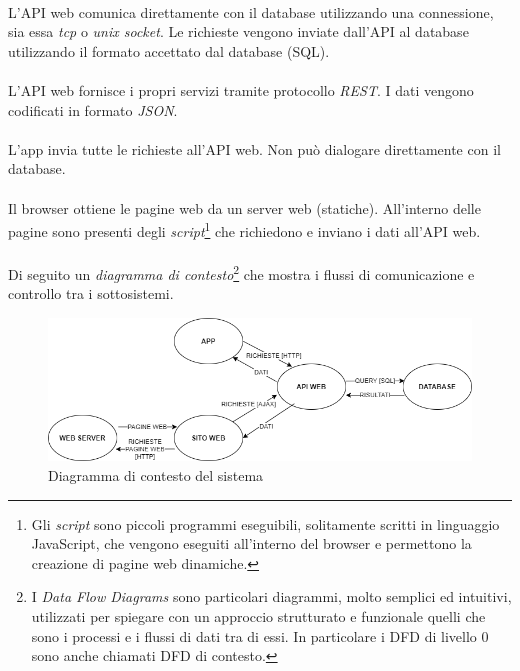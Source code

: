 \documentclass[11pt,a4paper,english]{article}
\begin{document}
\paragraph{} L'API web comunica direttamente con il database utilizzando una connessione, sia essa \emph{tcp} o \emph{unix socket}. Le richieste vengono inviate dall'API al database utilizzando il formato accettato dal database (SQL). 

\paragraph{} L'API web fornisce i propri servizi tramite protocollo \emph{REST}. I dati vengono codificati in formato \emph{JSON}. 

\paragraph{} L'app invia tutte le richieste all'API web. Non può dialogare direttamente con il database.

\paragraph{} Il browser ottiene le pagine web da un server web (statiche). All'interno delle pagine sono presenti degli \emph{script}\footnote{Gli \emph{script} sono piccoli programmi eseguibili, solitamente scritti in linguaggio JavaScript, che vengono eseguiti all'interno del browser e permettono la creazione di pagine web dinamiche.} che richiedono e inviano i dati all'API web. 

\paragraph{} Di seguito un \emph{diagramma di contesto}\footnote{I \emph{Data Flow Diagrams} sono particolari diagrammi, molto semplici ed intuitivi, utilizzati per spiegare con un approccio strutturato e funzionale quelli che sono i processi e i flussi di dati tra di essi. In particolare i DFD di livello 0 sono anche chiamati DFD di contesto.} \cite{dfd0} che mostra i flussi di comunicazione e controllo tra i sottosistemi.

\begin{figure}[H]
    \centering
    \includegraphics[width=1\textwidth]{img/architettura.png}
    \caption{Diagramma di contesto del sistema}
\end{figure}
\end{document}

